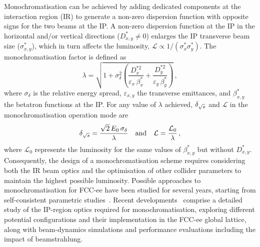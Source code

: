 Monochromatisation can be achieved by adding dedicated components at the interaction region (IR) to generate a non-zero dispersion function with opposite signs for the two beams at the IP. 
A non-zero dispersion function at the IP in the horizontal and/or vertical directions ($D_{x,y}^{\ast} \neq 0$) enlarges the IP transverse beam size ($\sigma_{x,y}^{\ast}$), which in turn affects the luminosity, $\mathcal{L} \propto 1/(\sigma_{x}^{\ast} \sigma_{y}^{\ast})$. 
The monochromatisation factor is defined as
\begin{equation}
    \lambda = \sqrt{1 + \sigma_{\delta}^2 
    \left( \frac{D_x^{\ast 2}}{\varepsilon_{x} \, \beta_{x}^{\ast}} + \frac{D_y^{\ast 2}}{\varepsilon_{y} \, \beta_{y}^{\ast}} \right) } \, ,
\label{eq:lambda_monochrom}
\end{equation}
where $\sigma_{\delta}$ is the relative energy spread, $\varepsilon_{x,y}$ the transverse emittances, and $\beta_{x,y}^{\ast}$ the betatron functions at the IP. 
For any value of $\lambda$ achieved, $\delta_{\sqrt{s}}$ and $\mathcal{L}$ in the monochromatisation operation mode are
\begin{equation}
    \delta_{\sqrt{s}} = \frac{\sqrt{2} \, E_0 \, \sigma_\delta}{\lambda} \quad \text{and} \quad 
    \mathcal{L} = \frac{\mathcal{L}_0}{\lambda} \, ,
\label{eq:delta_sqrts}
\end{equation}
where $\mathcal{L}_0$ represents the luminosity for the same values of $\beta_{x,y}^{\ast}$ but without $D_{x,y}^{\ast}$. 
Consequently, the design of a monochromatisation scheme requires considering both the IR beam optics and the optimisation of other collider parameters to maintain the highest possible luminosity. 
Possible approaches to monochromatisation for FCC-ee have been studied for several years, starting from self-consistent parametric studies~\cite{ValdiviaGarcia:2016rdg,Zimmermann:2017tjv,Faus-Golfe:2021udx,ValdiviaGarcia:2022nks}. 
Recent  developments~\cite{Zhang:2024sao,Zhang:2024phd} comprise a detailed study of the IP-region optics required for monochromatisation, exploring different potential configurations and their implementation in the FCC-ee global lattice, along with beam-dynamics simulations and performance evaluations including the impact of beamstrahlung. 

